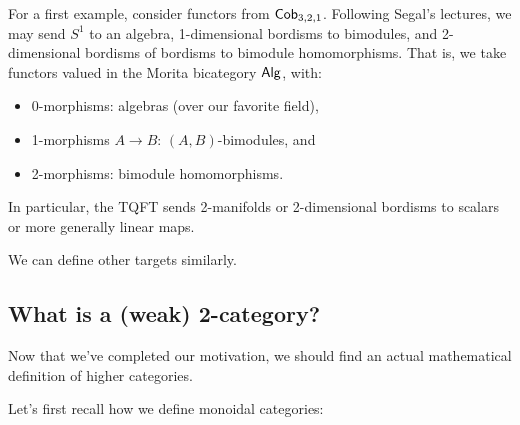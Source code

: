 \begin{ex}
	For a first example, consider functors from $\mathsf{Cob}_{3,2,1}$.
	Following Segal's lectures, we may send $S^1$ to an algebra, 1-dimensional bordisms to bimodules, and 2-dimensional bordisms of bordisms to bimodule homomorphisms.
	That is, we take functors valued in the Morita bicategory $\mathsf{Alg}$, with:
	\begin{itemize}
		\item 0-morphisms: algebras (over our favorite field),
		\item 1-morphisms $A \to B$: $(A, B)$-bimodules, and
		\item 2-morphisms: bimodule homomorphisms.
	\end{itemize}
	In particular, the TQFT sends 2-manifolds or 2-dimensional bordisms to scalars or more generally linear maps.
\end{ex}

We can define other targets similarly.

\subsection{What is a (weak) 2-category?}

Now that we've completed our motivation, we should find an actual mathematical definition of higher categories.

Let's first recall how we define monoidal categories:

